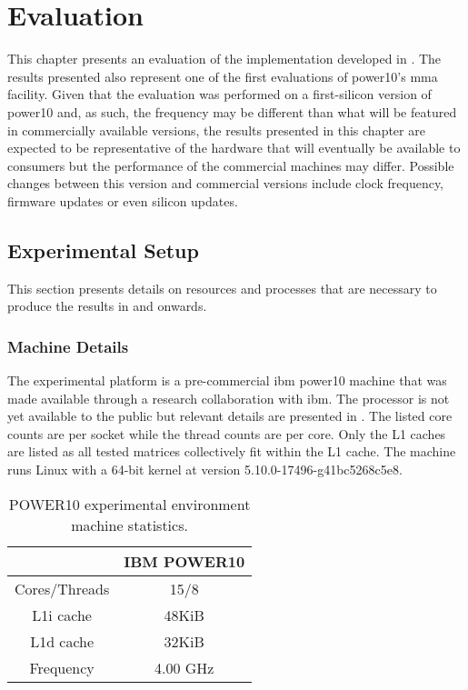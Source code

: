 \documentclass[\main/thesis.tex]{subfiles}
\begin{document}
\chapter{Evaluation}
\label{cha:evaluation}
This chapter presents an evaluation of the implementation developed in .
The results presented also represent one of the first evaluations of \gls{power10}'s \gls{mma} facility.
Given that the evaluation was performed on a first-silicon version of \gls{power10} and, as such, the frequency may be different than what will be featured in commercially available versions, the results presented in this chapter are expected to be representative of the hardware that will eventually be available to consumers but the performance of the commercial machines may differ.
Possible changes between this version and commercial versions include clock frequency, firmware updates or even silicon updates.

\section{Experimental Setup}
This section presents details on resources and processes that are necessary to produce the results in  and onwards.

\subsection{Machine Details}
The experimental platform is a pre-commercial \gls{ibm} \gls{power10} machine that was made available through a research collaboration with \gls{ibm}.
The processor is not yet available to the public but relevant details are presented in .
The listed core counts are per socket while the thread counts are per core.
Only the L1 caches are listed as all tested matrices collectively fit within the L1 cache.
The machine runs Linux with a 64-bit kernel at version 5.10.0-17496-g41bc5268c5e8.

\begin{table}[t]
  \centering
  \begin{tabular}{c | c}
    & IBM POWER10\\\hline
    Cores/Threads & 15/8\\
    L1i cache & 48KiB\\
    L1d cache & 32KiB\\
    Frequency & 4.00 GHz\\
  \end{tabular}
  \caption[POWER10 Machine Statistics]{POWER10 experimental environment machine statistics.}
  \label{tab:machineInfo}
\end{table}
\end{document}
